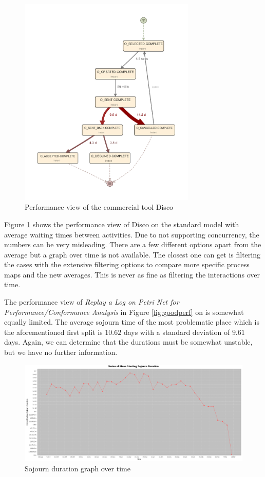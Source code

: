 \begin{figure}[H]
    \centering
    \includegraphics[width=0.75\textwidth]{figures/evaluation/disco_processmap.pdf}
    \caption{Performance view of the commercial tool Disco}
    \label{fig:discoperf}
\end{figure}

Figure \ref{fig:discoperf} shows the performance view of Disco on the standard model with average waiting times between activities. Due to not supporting concurrency, the numbers can be very misleading. There are a few different options apart from the average but a graph over time is not available.
The closest one can get is filtering the cases with the extensive filtering options to compare more specific process maps and the new averages. This is never as fine as filtering the interactions over time.

The performance view of \emph{Replay a Log on Petri Net for Performance/Conformance Analysis} in Figure \ref{fig:goodperf} on  is somewhat equally limited. The average sojourn time of the most problematic place which is the aforementioned first split is $10.62$ days with a standard deviation of $9.61$ days. Again, we can determine that the durations must be somewhat unstable, but we have no further information.

\begin{figure}[H]
    \centering
    \includegraphics[width=\textwidth]{figures/evaluation/splitplace_perf.png}
    \caption{Sojourn duration graph over time}
    \label{fig:splitplaceperf}
\end{figure}

